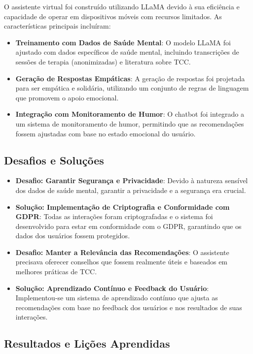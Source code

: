 \documentclass[14pt,a4paper,oneside]{book}
\begin{document}
O assistente virtual foi construído utilizando LLaMA devido à sua eficiência e capacidade de operar em dispositivos móveis com recursos limitados. As características principais incluíram:

\begin{itemize}
	\item \textbf{Treinamento com Dados de Saúde Mental}: O modelo LLaMA foi ajustado com dados específicos de saúde mental, incluindo transcrições de sessões de terapia (anonimizadas) e literatura sobre TCC.
	\item \textbf{Geração de Respostas Empáticas}: A geração de respostas foi projetada para ser empática e solidária, utilizando um conjunto de regras de linguagem que promovem o apoio emocional.
	\item \textbf{Integração com Monitoramento de Humor}: O chatbot foi integrado a um sistema de monitoramento de humor, permitindo que as recomendações fossem ajustadas com base no estado emocional do usuário.
\end{itemize}

\subsection{Desafios e Soluções}

\begin{itemize}
	\item \textbf{Desafio: Garantir Segurança e Privacidade}: Devido à natureza sensível dos dados de saúde mental, garantir a privacidade e a segurança era crucial.
	\item \textbf{Solução: Implementação de Criptografia e Conformidade com GDPR}: Todas as interações foram criptografadas e o sistema foi desenvolvido para estar em conformidade com o GDPR, garantindo que os dados dos usuários fossem protegidos.
	\item \textbf{Desafio: Manter a Relevância das Recomendações}: O assistente precisava oferecer conselhos que fossem realmente úteis e baseados em melhores práticas de TCC.
	\item \textbf{Solução: Aprendizado Contínuo e Feedback do Usuário}: Implementou-se um sistema de aprendizado contínuo que ajusta as recomendações com base no feedback dos usuários e nos resultados de suas interações.
\end{itemize}

\subsection{Resultados e Lições Aprendidas}
\end{document}
